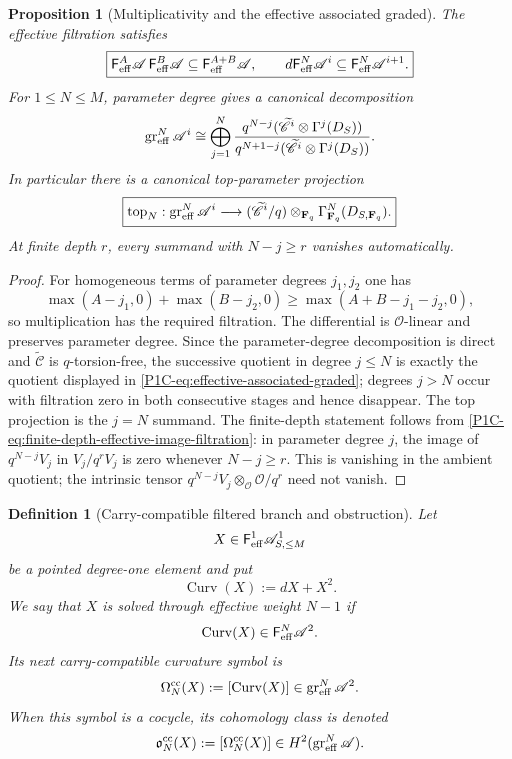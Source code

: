 \documentclass[11pt]{article}
\newtheorem{proposition}[theorem]{Proposition}
\newtheorem{definition}[theorem]{Definition}
\theoremstyle{remark}
\newcommand{\F}{\mathbf F}
\begin{document}
\begin{proposition}[Multiplicativity and the effective associated graded]
\label{P1C-prop:effective-weight-multiplicative}
The effective filtration satisfies
\[
 \boxed{
 \mathsf F_{\rm eff}^{A}\mathscr A\,
 \mathsf F_{\rm eff}^{B}\mathscr A
 \subseteq
 \mathsf F_{\rm eff}^{A+B}\mathscr A,
 \qquad
 d\mathsf F_{\rm eff}^{N}\mathscr A^i
 \subseteq
 \mathsf F_{\rm eff}^{N}\mathscr A^{i+1}.}
\]
For $1\le N\le M$, parameter degree gives a canonical decomposition
\begin{equation}\label{P1C-eq:effective-associated-graded}
 \operatorname{gr}^{N}_{\rm eff}\mathscr A^i
 \cong
 \bigoplus_{j=1}^{N}
 \frac{q^{N-j}
 (\widetilde{\mathscr C}^{i}\otimes\Gamma^j(D_S))}
 {q^{N+1-j}
 (\widetilde{\mathscr C}^{i}\otimes\Gamma^j(D_S))}.
\end{equation}
In particular there is a canonical top-parameter projection
\begin{equation}\label{P1C-eq:effective-top-projection}
 \boxed{
 \operatorname{top}_N:
 \operatorname{gr}^{N}_{\rm eff}\mathscr A^i
 \longrightarrow
 (\widetilde{\mathscr C}^{i}/q)
 \otimes_{\F_q}\Gamma^N_{\F_q}(D_{S,\F_q}).}
\end{equation}
At finite depth $r$, every summand with $N-j\ge r$ vanishes automatically.
\end{proposition}

\begin{proof}
For homogeneous terms of parameter degrees $j_1,j_2$ one has
\[
 \max(A-j_1,0)+\max(B-j_2,0)
 \ge \max(A+B-j_1-j_2,0),
\]
so multiplication has the required filtration.  The differential is $\mathcal O$-linear and preserves
parameter degree.  Since the parameter-degree decomposition is direct and
$\widetilde{\mathscr C}$ is $q$-torsion-free, the successive quotient in degree $j\le N$ is exactly the
quotient displayed in \eqref{P1C-eq:effective-associated-graded}; degrees $j>N$ occur with filtration zero
in both consecutive stages and hence disappear.  The top projection is the $j=N$ summand.  The
finite-depth statement follows from
\eqref{P1C-eq:finite-depth-effective-image-filtration}: in parameter degree
$j$, the image of $q^{N-j}V_j$ in $V_j/q^rV_j$ is zero whenever
$N-j\ge r$.  This is vanishing in the ambient quotient; the intrinsic tensor
$q^{N-j}V_j\otimes_{\mathcal O}\mathcal O/q^r$ need not vanish.
\end{proof}

\begin{definition}[Carry-compatible filtered branch and obstruction]\label{P1C-def:cc-filtered-branch}
Let
\[
 X\in \mathsf F_{\rm eff}^{1}\mathscr A^1_{S,\le M}
\]
be a pointed degree-one element and put
\[
 \operatorname{Curv}(X):=dX+X^2.
\]
We say that $X$ is solved through effective weight $N-1$ if
\[
 \operatorname{Curv}(X)\in\mathsf F_{\rm eff}^{N}\mathscr A^2.
\]
Its next carry-compatible curvature symbol is
\[
 \Omega_N^{\rm cc}(X)
 :=[\operatorname{Curv}(X)]
 \in\operatorname{gr}^{N}_{\rm eff}\mathscr A^2.
\]
When this symbol is a cocycle, its cohomology class is denoted
\[
 \mathfrak o_N^{\rm cc}(X)
 :=[\Omega_N^{\rm cc}(X)]
 \in H^2(\operatorname{gr}^{N}_{\rm eff}\mathscr A).
\]
\end{definition}
\end{document}
